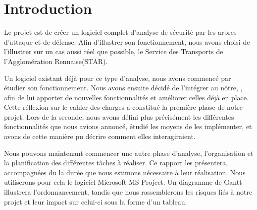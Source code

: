 \section{Introduction}
	\label{sec:intro}





	Le projet est de créer un logiciel complet d'analyse de sécurité par les arbres d'attaque et de défense. Afin d'illustrer son fonctionnement, nous avons choisi de l'illustrer sur un cas aussi réel que possible, le Service des Transports de l'Agglomération Rennaise(STAR).

	Un logiciel existant déjà pour ce type d'analyse, nous avons commencé par étudier son fonctionnement. Nous avons ensuite décidé de l'intégrer au nôtre, \glasir{}, afin de lui apporter de nouvelles fonctionnalités et améliorer celles déjà en place. Cette réflexion sur le cahier des charges a constitué la première phase de notre projet. Lors de la seconde, nous avons défini plus précisément les différentes fonctionnalités que nous avions annoncé, étudié les moyens de les implémenter, et avons de cette manière pu décrire comment elles interagiraient.

	Nous pouvons maintenant commencer une autre phase d'analyse, l'organisation et la planification des différentes tâches à réaliser. Ce rapport les présentera, accompagnées du la durée que nous estimons nécessaire à leur réalisation. Nous utiliserons pour cela le logiciel Microsoft MS Project. Un diagramme de Gantt illustrera l'ordonnancement, tandis que nous rassemblerons les risques liés à notre projet et leur impact sur celui-ci sous la forme d'un tableau.